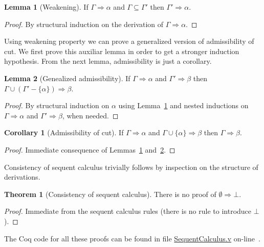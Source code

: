 \documentclass[12pt]{article}
\theoremstyle{definition}
\newtheorem{Theorem}{Theorem}
\newtheorem{Corollary}{Corollary}
\newtheorem{Lemma}{Lemma}
\begin{document}
\begin{Lemma}[Weakening]\label{lemma:weak}
  If $\Gamma \Rightarrow \alpha$ and $\Gamma \subseteq \Gamma'$ then $\Gamma'
  \Rightarrow \alpha$.
\end{Lemma}
\begin{proof}
  By structural induction on the derivation of $\Gamma \Rightarrow \alpha$.
\end{proof}

Using weakening property we can prove a generalized version of admissibility of
cut. We first prove this auxiliar lemma in order to get a stronger induction
hypothesis. From the next lemma, admissibility is just a corollary.

\begin{Lemma}[Genealized admissibility]\label{lemma:admissibility}
  If $\Gamma \Rightarrow \alpha$ and $\Gamma' \Rightarrow \beta$ then $\Gamma
  \cup (\Gamma' - \{\alpha\}) \Rightarrow \beta$.
\end{Lemma}
\begin{proof}
  By structural induction on $\alpha$ using Lemma~\ref{lemma:weak} and
  nested inductions on $\Gamma \Rightarrow \alpha$ and
  $\Gamma' \Rightarrow \beta$, when needed.
\end{proof}

\begin{Corollary}[Admissibility of cut]
  If $\Gamma \Rightarrow \alpha$ and $\Gamma \cup\{\alpha\}\Rightarrow \beta$
  then $\Gamma \Rightarrow \beta$.
\end{Corollary}
\begin{proof}
  Immediate consequence of Lemmas~\ref{lemma:weak} and~\ref{lemma:admissibility}.
\end{proof}

Consistency of sequent calculus trivially follows by inspection on the structure of
derivations.

\begin{Theorem}[Consistency of sequent calculus]\label{theorem:consistency}
  There is no proof of $\emptyset \Rightarrow \bot$.
\end{Theorem}
\begin{proof}
  Immediate from the sequent calculus rules (there is no rule to introduce $\bot$).
\end{proof}

The Coq code for all these proofs can be found in file
\href{https://github.com/rodrigogribeiro/consistency-coq/blob/master/Minimal/SequentCalculus.v}{SequentCalculus.v}
on-line~\cite{Sasdelli20}.
\end{document}
